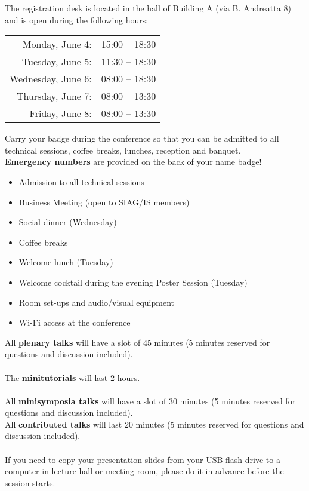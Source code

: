 \newpage

The registration desk is located in the hall of Building A (via B. Andreatta 8) and is open during the following hours:

\bigskip

\begin{tabular}{r l }
      Monday, June 4: & 15:00 -- 18:30 \\
     Tuesday, June 5: & 11:30 -- 18:30 \\
   Wednesday, June 6: & 08:00 -- 18:30 \\
    Thursday, June 7: & 08:00 -- 13:30 \\
      Friday, June 8: & 08:00 -- 13:30 \\
\end{tabular}

Carry your badge during the conference so that you can be admitted to all technical sessions, coffee breaks, lunches, reception and banquet.\\
\textbf{Emergency numbers} are provided on the back of your name badge! 


\bigskip

\begin{itemize}
  \item Admission to all technical sessions
  \item Business Meeting (open to SIAG/IS members)
  \item Social dinner (Wednesday)
  \item Coffee breaks 
  \item Welcome lunch (Tuesday)
  \item Welcome cocktail during the evening Poster Session (Tuesday)
  \item Room set-ups and audio/visual equipment
  \item Wi-Fi access at the conference
\end{itemize}%



\noindent All \textbf{plenary talks} will have a slot of 45 minutes
(5 minutes reserved for questions and discussion included).\\\\
The \textbf{minitutorials} will last 2 hours.\\\\
All \textbf{minisymposia talks} will have a slot of 30 minutes (5 minutes reserved for questions and discussion included).\\
All \textbf{contributed talks} will last 20 minutes (5 minutes reserved for questions and discussion included).\\\\
If you need to copy your presentation slides from your USB flash drive to a computer in lecture hall or meeting room, please do it in advance before
the session starts.

